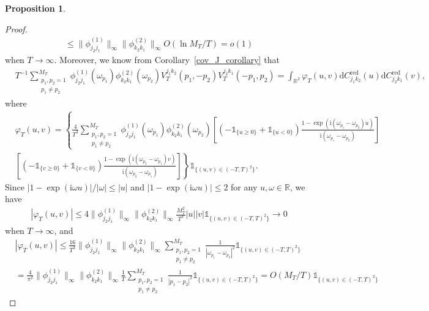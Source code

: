 \documentclass[11pt]{article}
\numberwithin{equation}{section}
\theoremstyle{plain}
\theoremstyle{definition}
\theoremstyle{definition}
\theoremstyle{assumption}
\theoremstyle{proposition}
\newtheorem{proposition}{Proposition}[section]
\theoremstyle{proposition}
\theoremstyle{example}
\theoremstyle{lemma}
\theoremstyle{theorem}
\theoremstyle{remark}
\begin{document}
\begin{proposition}
\begin{proof}
\begin{align*}
\leqslant \|\phi_{j_2 j_1}^{(1)}\|_{\infty}\|\phi_{k_2 k_1}^{(2)}\|_{\infty}O\left(\ln M_T/ T\right) = o(1)
\end{align*}
when $T\rightarrow\infty$. Moreover, we know from Corollary~\ref{cov_J_corollary} that
\begin{align*}
&T^{-1}\sum_{\substack{p_1,p_2=1 \\ p_1\neq p_2}}^{M_T}\phi_{j_2 j_1}^{(1)}(\omega_{p_1}) \phi_{k_2 k_1}^{(2)}(\omega_{p_2})V_{T}^{j_1 k_2}(p_1,-p_2) V_{T}^{j_2 k_1}(-p_1,p_2)
= \int_{\mathbb{R}^2} \varphi_{T}(u,v)\mathrm{d}C_{j_1 k_2}^{\mathrm{red}}(u)\mathrm{d}C_{j_2 k_1}^{\mathrm{red}}(v) ,
\end{align*}
where
\begin{align*}
&\varphi_{T}(u,v) = \left\{\frac{4}{T^3}\sum_{\substack{p_1,p_2=1 \\ p_1\neq p_2}}^{M_T}\phi_{j_2 j_1}^{(1)}(\omega_{p_1}) \phi_{k_2 k_1}^{(2)}(\omega_{p_2}) 
\left[\left(-\mathds{1}_{\{u \geqslant 0\}} + \mathds{1}_{\{u < 0\}}\right)\frac{1 - \exp(\mathrm{i}(\omega_{p_1} - \omega_{p_2})u)}{\mathrm{i}(\omega_{p_1} - \omega_{p_2})}\right]\right. \\
&\left. \left[\left(-\mathds{1}_{\{v \geqslant 0\}} + \mathds{1}_{\{v < 0\}}\right)\frac{1 - \exp(\mathrm{i}(\omega_{p_2} - \omega_{p_1})v)}{\mathrm{i}(\omega_{p_2} - \omega_{p_1})}\right] \right\}\mathds{1}_{\{(u,v)\in (-T,T)^2\}} .   
\end{align*}
Since $|1 - \exp(\mathrm{i}\omega u)|/|\omega|\leqslant |u|$ and $|1 - \exp(\mathrm{i}\omega u)|\leqslant 2$ for any $u, \omega\in\mathbb{R}$, we have
\begin{align*}
|\varphi_{T}(u,v)|
\leqslant 4\|\phi_{j_2 j_1}^{(1)}\|_{\infty}\|\phi_{k_2 k_1}^{(2)}\|_{\infty}\frac{M_T^2}{T^3}|u||v|\mathds{1}_{\{(u,v)\in (-T,T)^2\}} \rightarrow 0
\end{align*}
when $T\rightarrow \infty$, and
\begin{align*}
&|\varphi_{T}(u,v)|
\leqslant \frac{16}{T^3}\|\phi_{j_2 j_1}^{(1)}\|_{\infty}\|\phi_{k_2 k_1}^{(2)}\|_{\infty} \sum_{\substack{p_1,p_2=1 \\ p_1\neq p_2}}^{M_T}\frac{1}{|\omega_{p_1} - \omega_{p_2}|^2} \mathds{1}_{\{(u,v)\in (-T,T)^2\}} \\
&= \frac{4}{\pi^2}\|\phi_{j_2 j_1}^{(1)}\|_{\infty}\|\phi_{k_2 k_1}^{(2)}\|_{\infty}\frac{1}{T}\sum_{\substack{p_1,p_2=1 \\ p_1\neq p_2}}^{M_T} \frac{1}{|p_1 - p_2|^2} \mathds{1}_{\{(u,v)\in (-T,T)^2\}} 
= O(M_T/T) \mathds{1}_{\{(u,v)\in (-T,T)^2\}}
\end{align*}

\end{proof}
\end{proposition}
\end{document}
